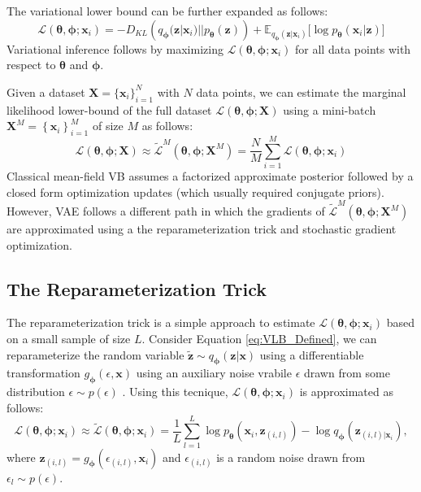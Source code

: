 \documentclass[graybox]{svmult}
\newcommand{\mb}[1]{\mathbf{#1}}
\newcommand{\bx}[0]{\mb{x}}
\newcommand{\bX}[0]{\mb{X}}
\newcommand{\bz}[0]{\mb{z}}
\newcommand{\tbz}[0]{\tilde{\mb{z}}}
\newcommand{\btheta}[0]{\mb{\theta}}
\newcommand{\bphi}[0]{\mb{\phi}}
\newcommand{\Ex}[2]{\mathbb{E}_{{#1}}\Big[ {#2} \Big]}
\newcommand{\mathL}[0]{\mathcal{L}}
\newcommand{\tmathL}[0]{\tilde{\mathcal{L}}}
\begin{document}
The variational lower bound can be further expanded as follows: 
\begin{equation}
\label{eq:variational_lower_bound}
    \mathL(\btheta,\bphi ; \bx_i) = -D_{KL} \left( q_\bphi (\bz|\bx_i) || p_\btheta (\bz) \right) + \Ex{q_\bphi(\bz|\bx_i)}{\log{p_\btheta(\bx_i|\bz)}}
\end{equation}
Variational inference follows by maximizing $\mathL(\btheta,\bphi ; \bx_i)$ for all data points with respect to $\btheta$ and $\bphi$. 


Given a dataset $\mb{X}=\{\bx_i\}_{i=1}^N$ with $N$ data points, we can estimate the marginal likelihood lower-bound of the full dataset $\mathcal{L} ( \btheta,\bphi ; \bX )$ using a mini-batch $\bX^M = \left\{ \bx_i \right\}_{i=1}^M$ of size $M$ as follows:
\begin{equation}
\label{eq:VLB_on_X}
    \mathL(\btheta,\bphi ; \bX) \approx \tmathL^M (\btheta,\bphi ; \bX^M) = \frac{N}{M}\sum_{i=1}^M\mathL(\btheta,\bphi ; \bx_i)
\end{equation}
Classical mean-field VB assumes a factorized approximate posterior followed by a closed form optimization updates (which usually required conjugate priors). However, VAE follows a different path in which the gradients of $\tilde{\mathcal{L}}^M (\btheta,\bphi ; \bX^M)$ are approximated using a the reparameterization trick and stochastic gradient optimization. 


\subsection{The Reparameterization Trick}
The reparameterization trick is a simple approach to  estimate 
$\mathL(\btheta,\bphi ; \bx_i)$ based on a small sample of size $L$. Consider Equation \ref{eq:VLB_Defined}, we can reparameterize the random variable $\tbz \sim q_\bphi(\bz|\bx)$ using a differentiable transformation 
$g_\bphi(\epsilon,\bx)$ using an auxiliary noise vrabile $\epsilon$ drawn from some distribution $\epsilon \sim p(\epsilon)$ \cite{VariationalAutoEncoder}.
Using this tecnique, $\mathL(\btheta,\bphi ; \bx_i)$ is approximated as follows:
\begin{equation}
\label{eq:reparameterization}
    \mathL(\btheta,\bphi ; \bx_i) \approx \tmathL(\btheta,\bphi ; \bx_i) =
    \frac{1}{L} \sum_{l=1}^L \log{p_\btheta(\bx_i,\bz_{(i,l)})}-\log{q_{\bphi}(\bz_{(i,l)|\bx_i})},
\end{equation}
where $\bz_{(i,l)}=g_\bphi(\epsilon_{(i,l)},\bx_i)$ and $\epsilon_{(i,l)}$ is a random noise drawn from $\epsilon_l \sim p(\epsilon)$.
\end{document}
